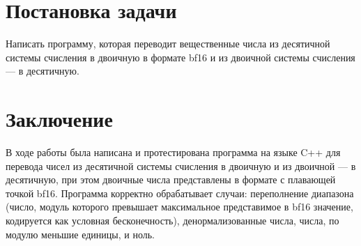 




\newpage

\tableofcontents
\newpage
\section{Постановка задачи}
Написать программу, которая переводит вещественные числа из десятичной
системы счисления в двоичную в формате bf16 и из двоичной
системы счисления --- в десятичную.

\newpage




\newpage

\section{Заключение}
В ходе работы была написана и протестирована программа на языке C++
для перевода чисел из десятичной системы счисления в двоичную и из двоичной ---
в десятичную, при этом двоичные числа представлены в формате с плавающей точкой
bf16. Программа корректно обрабатывает случаи: переполнение диапазона
(число, модуль которого превышает максимальное представимое в bf16
значение, кодируется как условная бесконечность), 
денормализованные числа, числа, по модулю меньшие единицы, и ноль. 
\newpage



